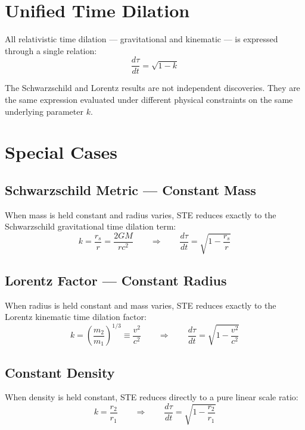 \documentclass[12pt,a4paper]{article}
\begin{document}
\section{Unified Time Dilation}

All relativistic time dilation --- gravitational and kinematic --- is expressed through a single relation:
\begin{equation}
\frac{d\tau}{dt} = \sqrt{1 - k}
\end{equation}

The Schwarzschild and Lorentz results are not independent discoveries. They are the same expression evaluated under different physical constraints on the same underlying parameter $k$.

\section{Special Cases}

\subsection{Schwarzschild Metric --- Constant Mass}

When mass is held constant and radius varies, STE reduces exactly to the Schwarzschild gravitational time dilation term:
\begin{equation}
k = \frac{r_s}{r} = \frac{2GM}{rc^2} \qquad \Rightarrow \qquad \frac{d\tau}{dt} = \sqrt{1 - \frac{r_s}{r}}
\end{equation}

\subsection{Lorentz Factor --- Constant Radius}

When radius is held constant and mass varies, STE reduces exactly to the Lorentz kinematic time dilation factor:
\begin{equation}
k = \left(\frac{m_2}{m_1}\right)^{1/3} \equiv \frac{v^2}{c^2} \qquad \Rightarrow \qquad \frac{d\tau}{dt} = \sqrt{1 - \frac{v^2}{c^2}}
\end{equation}

\subsection{Constant Density}

When density is held constant, STE reduces directly to a pure linear scale ratio:
\begin{equation}
k = \frac{r_2}{r_1} \qquad \Rightarrow \qquad \frac{d\tau}{dt} = \sqrt{1 - \frac{r_2}{r_1}}
\end{equation}
\end{document}
